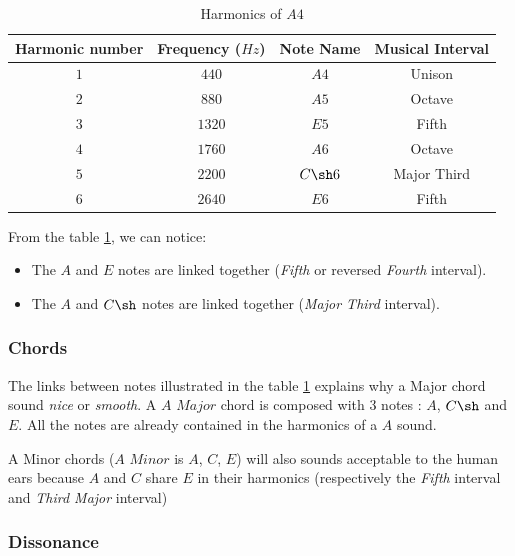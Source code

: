 \documentclass[12pt]{report}
\begin{document}
\begin{table} [ht]
    \begin{center}
        \begin{tabular} {c||c|c|c}
            Harmonic number & Frequency ($Hz$) & Note Name & Musical Interval \\
            \hline
            $1$ & $440$ & $A4$ & Unison \\
            $2$ & $880$ & $A5$ & Octave \\
            $3$ & $1320$ & $E5$ & Fifth \\
            $4$ & $1760$ & $A6$ & Octave \\
            $5$ & $2200$ & $C\sh6$ & Major Third \\
            $6$ & $2640$ & $E6$ & Fifth \\
        \end{tabular}
        \caption{Harmonics of $A4$}
        \label{tab:A4_harmonics}
    \end{center}
\end{table}

From the table \ref{tab:A4_harmonics}, we can notice:
\begin{itemize}
    \item The $A$ and $E$ notes are linked together (\textit{Fifth} or reversed \textit{Fourth} interval).
    \item The $A$ and $C\sh$ notes are linked together (\textit{Major Third} interval).
\end{itemize}


\subsubsection{Chords}

The links between notes illustrated in the table \ref{tab:A4_harmonics} explains why a Major chord sound \textit{nice} or \textit{smooth}.
A $A$ $Major$ chord is composed with 3 notes : $A$, $C\sh$ and $E$. All the notes are already contained in the harmonics of a $A$ sound.

A Minor chords ($A$ $Minor$ is $A$, $C$, $E$) will also sounds acceptable to the human ears because $A$ and $C$ share $E$ in their harmonics (respectively the \textit{Fifth} interval and \textit{Third Major} interval) 

\subsubsection{Dissonance}
\end{document}
